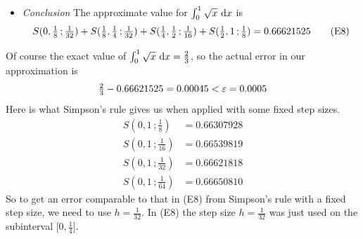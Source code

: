 \begin{eg}
\begin{itemize}
\item\emph{Conclusion} The approximate value for $\int_0^1\sqrt{x}\ \mathrm{d}x$
is
\begin{equation*}
S(0,\tfrac{1}{8}\,;\tfrac{1}{32})
+S(\tfrac{1}{8},\tfrac{1}{4}\,;\tfrac{1}{32})
+S(\tfrac{1}{4},\tfrac{1}{2}\,;\tfrac{1}{16})
+S(\tfrac{1}{2},1\,;\tfrac{1}{8})
=0.66621525
\tag{E8}\end{equation*}
\end{itemize}
Of course the exact value of $\int_0^1\sqrt{x}\ \mathrm{d}x=\tfrac{2}{3}$,
so the actual error in our approximation is
\begin{equation*}
\tfrac{2}{3}-0.66621525 = 0.00045 <\varepsilon = 0.0005
\end{equation*}
Here is what Simpson's rule gives us when applied with some fixed step sizes. 
\begin{align*}
S(0,1\,;\tfrac{1}{8})  &= 0.66307928 \\
S(0,1\,;\tfrac{1}{16}) &= 0.66539819 \\
S(0,1\,;\tfrac{1}{32}) &= 0.66621818 \\
S(0,1\,;\tfrac{1}{64}) &= 0.66650810 
\end{align*}
So to get an error comparable to that in (E8) from Simpson's rule with
a fixed step size, we need to use $h=\frac{1}{32}$. In (E8) the step size
$h=\frac{1}{32}$ was just used on the subinterval $\big[0,\frac{1}{4}\big]$.

\end{eg}
